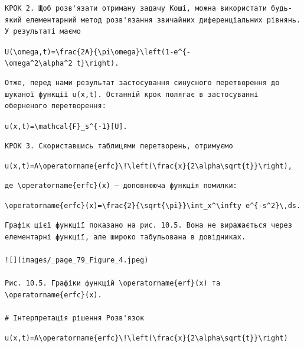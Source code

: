 \documentclass[
  ukrainian,
]{article}
\begin{document}
\begin{verbatim}
КРОК 2. Щоб розв'язати отриману задачу Коші, можна використати будь-який елементарний метод розв'язання звичайних диференціальних рівнянь. У результаті маємо
\end{verbatim}

\texttt{U(\textbackslash{}omega,t)=\textbackslash{}frac\{2A\}\{\textbackslash{}pi\textbackslash{}omega\}\textbackslash{}left(1-e\^{}\{-\textbackslash{}omega\^{}2\textbackslash{}alpha\^{}2\ t\}\textbackslash{}right).}

\begin{verbatim}
Отже, перед нами результат застосування синусного перетворення до шуканої функції u(x,t). Останній крок полягає в застосуванні оберненого перетворення:
\end{verbatim}

\texttt{u(x,t)=\textbackslash{}mathcal\{F\}\_s\^{}\{-1\}{[}U{]}.}

\begin{verbatim}
КРОК 3. Скориставшись таблицями перетворень, отримуємо
\end{verbatim}

\texttt{u(x,t)=A\textbackslash{}operatorname\{erfc\}\textbackslash{}!\textbackslash{}left(\textbackslash{}frac\{x\}\{2\textbackslash{}alpha\textbackslash{}sqrt\{t\}\}\textbackslash{}right),}

\begin{verbatim}
де \operatorname{erfc}(x) — доповнююча функція помилки:
\end{verbatim}

\texttt{\textbackslash{}operatorname\{erfc\}(x)=\textbackslash{}frac\{2\}\{\textbackslash{}sqrt\{\textbackslash{}pi\}\}\textbackslash{}int\_x\^{}\textbackslash{}infty\ e\^{}\{-s\^{}2\}\textbackslash{},ds.}

\begin{verbatim}
Графік цієї функції показано на рис. 10.5. Вона не виражається через елементарні функції, але широко табульована в довідниках.

![](images/_page_79_Figure_4.jpeg)

Рис. 10.5. Графіки функцій \operatorname{erf}(x) та \operatorname{erfc}(x).

# Інтерпретація рішення Розв'язок
\end{verbatim}

\texttt{u(x,t)=A\textbackslash{}operatorname\{erfc\}\textbackslash{}!\textbackslash{}left(\textbackslash{}frac\{x\}\{2\textbackslash{}alpha\textbackslash{}sqrt\{t\}\}\textbackslash{}right)}
\end{document}
